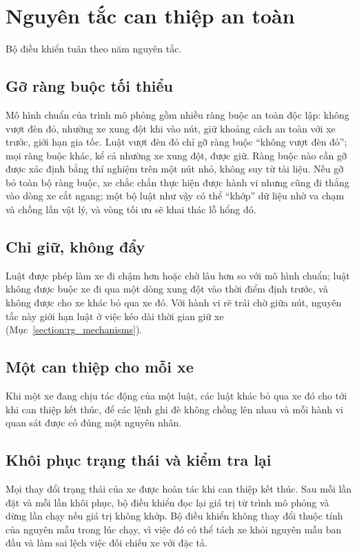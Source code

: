 \documentclass[../main.tex]{subfiles}
\begin{document}
\section{Nguyên tắc can thiệp an toàn}
\label{section:3.5}

Bộ điều khiển tuân theo năm nguyên tắc.

\subsection{Gỡ ràng buộc tối thiểu}

Mô hình chuẩn của trình mô phỏng gồm nhiều ràng buộc an toàn độc lập: không vượt đèn đỏ, nhường xe xung đột khi vào nút, giữ khoảng cách an toàn với xe trước, giới hạn gia tốc. Luật vượt đèn đỏ chỉ gỡ ràng buộc ``không vượt đèn đỏ''; mọi ràng buộc khác, kể cả nhường xe xung đột, được giữ. Ràng buộc nào cần gỡ được xác định bằng thí nghiệm trên một nút nhỏ, không suy từ tài liệu. Nếu gỡ bỏ toàn bộ ràng buộc, xe chắc chắn thực hiện được hành vi nhưng cũng đi thẳng vào dòng xe cắt ngang; một bộ luật như vậy có thể ``khớp'' dữ liệu nhờ va chạm và chồng lấn vật lý, và vòng tối ưu sẽ khai thác lỗ hổng đó.

\subsection{Chỉ giữ, không đẩy}

Luật được phép làm xe đi chậm hơn hoặc chờ lâu hơn so với mô hình chuẩn; luật không được buộc xe đi qua một dòng xung đột vào thời điểm định trước, và không được cho xe khác bỏ qua xe đó. Với hành vi rẽ trái chờ giữa nút, nguyên tắc này giới hạn luật ở việc kéo dài thời gian giữ xe (Mục~\ref{section:rg_mechanisms}).

\subsection{Một can thiệp cho mỗi xe}

Khi một xe đang chịu tác động của một luật, các luật khác bỏ qua xe đó cho tới khi can thiệp kết thúc, để các lệnh ghi đè không chồng lên nhau và mỗi hành vi quan sát được có đúng một nguyên nhân.

\subsection{Khôi phục trạng thái và kiểm tra lại}

Mọi thay đổi trạng thái của xe được hoàn tác khi can thiệp kết thúc. Sau mỗi lần đặt và mỗi lần khôi phục, bộ điều khiển đọc lại giá trị từ trình mô phỏng và dừng lần chạy nếu giá trị không khớp. Bộ điều khiển không thay đổi thuộc tính của nguyên mẫu trong lúc chạy, vì việc đó có thể tách xe khỏi nguyên mẫu ban đầu và làm sai lệch việc đối chiếu xe với đặc tả.
\end{document}

